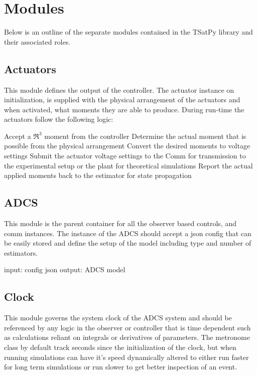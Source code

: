 




\section{Modules}
\label{sec:Modules}

Below is an outline of the separate modules contained in the TSatPy library and their associated roles.

\subsection{Actuators}
\label{subsec:actuators}

This module defines the output of the controller. The actuator instance on initialization, is supplied with the physical arrangement of the actuators and when activated, what moments they are able to produce. During run-time the actuators follow the following logic:

    Accept a $\Re^3$ moment from the controller
    Determine the actual moment that is possible from the physical arrangement
    Convert the desired moments to voltage settings
    Submit the actuator voltage settings to
        the Comm for transmission to the experimental setup or
        the plant for theoretical simulations
    Report the actual applied moments back to the estimator for state propagation

\subsection{ADCS}
\label{subsec:ADCS}


This module is the parent container for all the observer based controls, and comm instances. The instance of the ADCS should accept a json config that can be easily stored and define the setup of the model including type and number of estimators.

    input: config json
    output: ADCS model

\subsection{Clock}
\label{subsec:Clock}


This module governs the system clock of the ADCS system and should be referenced by any logic in the observer or controller that is time dependent such as calculations reliant on integrals or derivatives of parameters. The metronome class by default track seconds since the initialization of the clock, but when running simulations can have it's speed dynamically altered to either run faster for long term simulations or run slower to get better inspection of an event.

